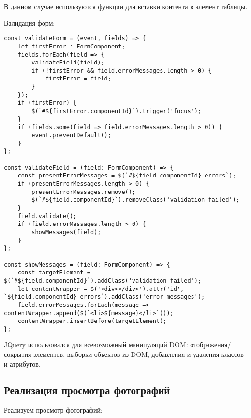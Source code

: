 \documentclass[a4paper,14pt]{extarticle}
\begin{document}
В данном случае используются функции  для вставки контента в элемент  таблицы.

Валидация форм:
\begin{lstlisting}
const validateForm = (event, fields) => {
    let firstError : FormComponent;
    fields.forEach(field => {
        validateField(field);
        if (!firstError && field.errorMessages.length > 0) {
            firstError = field;
        }
    });
    if (firstError) {
        $(`#${firstError.componentId}`).trigger('focus');
    }
    if (fields.some(field => field.errorMessages.length > 0)) {
        event.preventDefault();
    }
};

const validateField = (field: FormComponent) => {
    const presentErrorMessages = $(`#${field.componentId}-errors`);
    if (presentErrorMessages.length > 0) {
        presentErrorMessages.remove();
        $(`#${field.componentId}`).removeClass('validation-failed');
    }
    field.validate();
    if (field.errorMessages.length > 0) {
        showMessages(field);
    }
};

const showMessages = (field: FormComponent) => {
    const targetElement = $(`#${field.componentId}`).addClass('validation-failed');
    let contentWrapper = $('<div></div>').attr('id', `${field.componentId}-errors`).addClass('error-messages');
    field.errorMessages.forEach(message => contentWrapper.append($(`<li>${message}</li>`)));
    contentWrapper.insertBefore(targetElement);
};
\end{lstlisting}

JQuery использовался для всевозможный манипуляций DOM:  отображения/сокрытия элементов,
выборки объектов из DOM, добавления и удаления классов и атрибутов.

\subsection{Реализация просмотра фотографий}
Реализуем просмотр фотографий:
\end{document}
